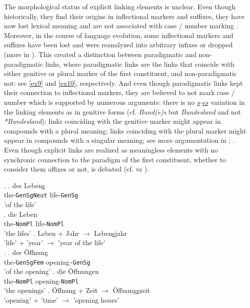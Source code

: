 \documentclass[11pt]{article}
\begin{document}
The morphological status of explicit linking elements is unclear. Even though historically, they find their origins in inflectional markers and suffixes, they have now lost lexical meaning and are not associated with case / number marking \cite[226]{eisenberg2016grundriss}. Moreover, in the course of language evolution, some inflectional markers and suffixes have been lost and were reanalyzed into arbitrary infixes or dropped (more in \citealt{Schlucker2022}). This created a distinction between paradigmatic and non-paradigmatic links, where paradigmatic links are the links that coincide with either genitive or plural marker of the first constituent, and non-paradigmatic not: see \ref{ex9} and \ref{ex10}, respectively. And even though paradigmatic links kept their connection to inflectional markers, they are believed to not mark case / number which is supported by numerous arguments: there is no \textit{\underline{s}-\underline{es}} variation in the linking elements as in genitive forms (cf. \textit{Bund(e)s} but \textit{Bundesland} and not \textit{*Bundesland}); links coinciding with the genitive marker might appear in compounds with a plural meaning; links coinciding with the plural marker might appear in compounds with a singular meaning; see more argumentation in \citet[230-231]{Schafer2018:a}; \citet[226-227]{eisenberg2016grundriss}. Even though explicit links are realized as meaningless elements with no synchronic connection to the paradigm of the first constituent, whether to consider them affixes or not, is debated (cf. \citealt{Schlucker2022} vs \citealt[227]{eisenberg2016grundriss}).

\ex. \label{ex9}
\ag. des Leben\underline{s} \\
the-\texttt{GenSgNeut} life-\texttt{GenSg} \\
{'of the life'} \\
\bg. die Leben \\
the-\texttt{NomPl} life-\texttt{NomPl} \\
{'the lifes'}
\cg. Leben + Jahr {$\rightarrow$} Leben\underline{s}jahr \\
'life' + 'year' {$\rightarrow$} {'year of the life'} \\

\ex. \label{ex10}
\ag. der {\"O}ffnung \\
the-\texttt{GenSgFem} opening\texttt{-GenSg} \\
{'of the opening'}
\bg. die {\"O}ffnungen \\
the-\texttt{NomPl} opening-\texttt{NomPl} \\
{'the openings'}
\cg. {\"O}ffnung + Zeit {$\rightarrow$} {\"O}ffnung\underline{s}zeit \\
'opening' + 'time' {$\rightarrow$} {'opening hours'} \\
\end{document}
